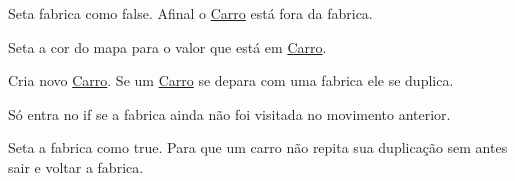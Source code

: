 Seta fabrica como false. Afinal o \mbox{\hyperlink{class_carro}{Carro}} está fora da fabrica.

Seta a cor do mapa para o valor que está em \mbox{\hyperlink{class_carro}{Carro}}.

Cria novo \mbox{\hyperlink{class_carro}{Carro}}. Se um \mbox{\hyperlink{class_carro}{Carro}} se depara com uma fabrica ele se duplica.

Só entra no if se a fabrica ainda não foi visitada no movimento anterior.

Seta a fabrica como true. Para que um carro não repita sua duplicação sem antes sair e voltar a fabrica. ~\newline
~\newline
~\newline
~\newline
~\newline
~\newline
~\newline
~\newline
~\newline
~\newline
~\newline
~\newline
~\newline
~\newline
~\newline
~\newline
~\newline
~\newline
~\newline
~\newline
~\newline
~\newline
~\newline
~\newline
~\newline
~\newline
~\newline
~\newline
~\newline
~\newline
~\newline
~\newline
~\newline
~\newline
~\newline
~\newline
~\newline
~\newline
~\newline

